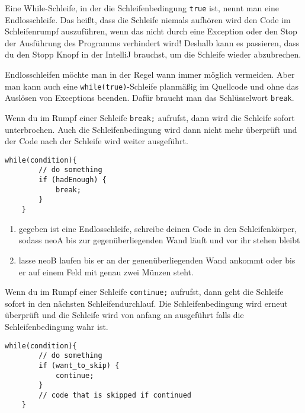 
\begin{Infobox}
	Eine While-Schleife, in der die Schleifenbedingung \lstinline{true} ist, nennt man eine Endlosschleife.
	Das heißt, dass die Schleife niemals aufhören wird den Code im Schleifenrumpf auszuführen, wenn das nicht durch eine Exception oder den Stop der Ausführung des Programms verhindert wird!
	Deshalb kann es passieren, dass du den Stopp Knopf in der IntelliJ brauchst, um die Schleife wieder abzubrechen.\newline

	Endlosschleifen möchte man in der Regel wann immer möglich vermeiden.
	Aber man kann auch eine \lstinline{while(true)}-Schleife planmäßig im Quellcode und ohne das Auslösen von Exceptions beenden.
	Dafür braucht man das Schlüsselwort \lstinline{break}.\newline

	Wenn du im Rumpf einer Schleife \lstinline{break;} aufrufst, dann wird die Schleife sofort unterbrochen.
	Auch die Schleifenbedingung wird dann nicht mehr überprüft und der Code nach der Schleife wird weiter ausgeführt.

	\begin{lstlisting}[numbers=none]
	while(condition){
		// do something
		if (hadEnough) {
			break;
		}
	}
	\end{lstlisting}
\end{Infobox}

\begin{enumerate} \setcounter{enumi}{0}
    \item gegeben ist eine Endlosschleife, schreibe deinen Code in den Schleifenkörper, sodass neoA bis zur gegenüberliegenden Wand läuft und vor ihr stehen bleibt
    \item lasse neoB laufen bis er an der genenüberliegenden Wand ankommt oder bis er auf einem Feld mit genau zwei Münzen steht.  
\end{enumerate}

\begin{Infobox}
	Wenn du im Rumpf einer Schleife \lstinline{continue;} aufrufst, dann geht die Schleife sofort in den nächsten Schleifendurchlauf.
	Die Schleifenbedingung wird erneut überprüft und die Schleife wird von anfang an ausgeführt falls die Schleifenbedingung wahr ist.

	\begin{lstlisting}[numbers=none]
	while(condition){
		// do something
		if (want_to_skip) {
			continue;
		}
		// code that is skipped if continued
	}
	\end{lstlisting}

\end{Infobox}
